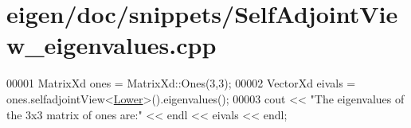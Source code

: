 \hypertarget{eigen_2doc_2snippets_2_self_adjoint_view__eigenvalues_8cpp_source}{}\section{eigen/doc/snippets/\+Self\+Adjoint\+View\+\_\+eigenvalues.cpp}
\label{eigen_2doc_2snippets_2_self_adjoint_view__eigenvalues_8cpp_source}

\begin{DoxyCode}
00001 MatrixXd ones = MatrixXd::Ones(3,3);
00002 VectorXd eivals = ones.selfadjointView<\hyperlink{group__enums_gga39e3366ff5554d731e7dc8bb642f83cda891792b8ed394f7607ab16dd716f60e6}{Lower}>().eigenvalues();
00003 cout << \textcolor{stringliteral}{"The eigenvalues of the 3x3 matrix of ones are:"} << endl << eivals << endl;
\end{DoxyCode}
